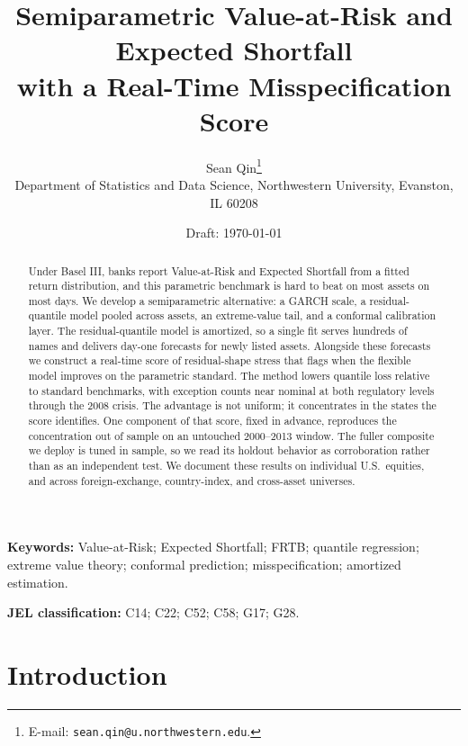 \documentclass[11pt]{article}
\title{Semiparametric Value-at-Risk and Expected Shortfall\\
with a Real-Time Misspecification Score}
\author{%
  Sean Qin\thanks{E-mail: \texttt{sean.qin@u.northwestern.edu}.}\\[4pt]
  \normalsize Department of Statistics and Data Science, Northwestern
  University, Evanston, IL 60208}
\date{Draft: \today}
\theoremstyle{remark}
\begin{document}
\maketitle

\begin{abstract}
Under Basel III, banks report Value-at-Risk and Expected Shortfall from a
fitted return distribution, and this parametric benchmark is hard to beat
on most assets on most days. We develop a semiparametric alternative: a
GARCH scale, a residual-quantile model pooled across assets, an
extreme-value tail, and a conformal calibration layer. The
residual-quantile model is amortized, so a single fit serves hundreds of
names and delivers day-one forecasts for newly listed assets. Alongside
these forecasts we construct a real-time score of residual-shape stress
that flags when the flexible model improves on the parametric standard.
The method lowers quantile loss relative to standard benchmarks, with
exception counts near nominal at both regulatory levels through the 2008
crisis. The advantage is not uniform; it concentrates in the states the score
identifies. One component of that score, fixed in advance, reproduces the
concentration out of sample on an untouched 2000--2013 window. The fuller
composite we deploy is tuned in sample, so we read its holdout behavior as
corroboration rather than as an independent test. We document these results on individual
U.S.\ equities, and across foreign-exchange, country-index, and
cross-asset universes.
\end{abstract}

\noindent\textbf{Keywords:} Value-at-Risk; Expected Shortfall; FRTB;
quantile regression; extreme value theory; conformal prediction;
misspecification; amortized estimation.

\medskip
\noindent\textbf{JEL classification:} C14; C22; C52; C58; G17; G28.

\section*{Introduction}\label{sec:intro}
\end{document}

